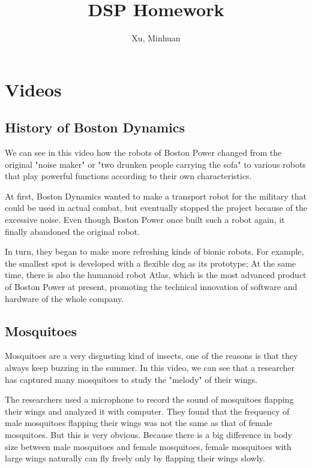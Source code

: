 \documentclass{article}
\begin{document}
\title{DSP Homework}
\author{Xu, Minhuan}
\maketitle
\tableofcontents
\begin{abstract}

\end{abstract}

\section{Videos}
\subsection{History of Boston Dynamics}
We can see in this video how the robots of Boston Power changed from the original "noise maker" or "two drunken people carrying the sofa" to various robots that play powerful functions according to their own characteristics.

At first, Boston Dynamics wanted to make a transport robot for the military that could be used in actual combat, but eventually stopped the project because of the excessive noise. Even though Boston Power once built such a robot again, it finally abandoned the original robot.

In turn, they began to make more refreshing kinds of bionic robots. For example, the smallest spot is developed with a flexible dog as its prototype; At the same time, there is also the humanoid robot Atlas, which is the most advanced product of Boston Power at present, promoting the technical innovation of software and hardware of the whole company.

\subsection{Mosquitoes}
Mosquitoes are a very disgusting kind of insects, one of the reasons is that they always keep buzzing in the summer. In this video, we can see that a researcher has captured many mosquitoes to study the "melody" of their wings.

The researchers used a microphone to record the sound of mosquitoes flapping their wings and analyzed it with computer. They found that the frequency of male mosquitoes flapping their wings was not the same as that of female mosquitoes. But this is very obvious. Because there is a big difference in body size between male mosquitoes and female mosquitoes, female mosquitoes with large wings naturally can fly freely only by flapping their wings slowly.
\end{document}
